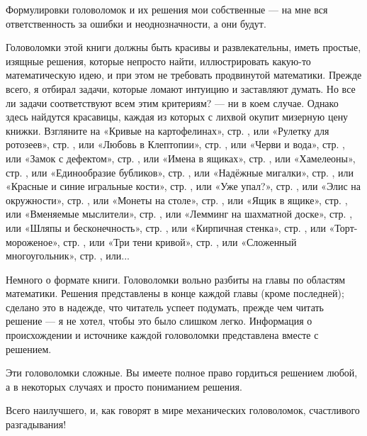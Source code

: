 Формулировки головоломок и их решения мои собственные --- на мне вся ответственность за ошибки и неоднозначности,
а они будут.

Головоломки этой книги должны быть красивы и развлекательны,
иметь простые, изящные решения, которые непросто найти,
иллюстрировать какую-то математическую идею,
и при этом не требовать продвинутой математики.
Прежде всего, я отбирал задачи, которые ломают интуицию и заставляют думать.
Но все ли задачи соответствуют всем этим критериям? --- ни в коем случае.
Однако здесь найдутся красавицы, каждая из которых с лихвой окупит мизерную цену книжки.
Взгляните на
«Кривые на картофелинах», стр. \pageref{Кривые на картофелинах}, или
«Рулетку для ротозеев», стр. \pageref{Рулетка для ротозеев}, или
«Любовь в Клептопии», стр. \pageref{Любовь в Клептопии}, или
«Черви и вода», стр. \pageref{Черви и вода}, или
«Замок с дефектом», стр. \pageref{Замок с дефектом}, или
«Имена в ящиках», стр. \pageref{Имена в ящиках}, или
«Хамелеоны», стр. \pageref{Хамелеоны}, или
«Единообразие бубликов», стр. \pageref{Единообразие бубликов}, или
«Надёжные мигалки», стр. \pageref{Надёжные мигалки}, или
«Красные и синие игральные кости», стр. \pageref{Красные и синие игральные кости}, или
«Уже упал?», стр. \pageref{Уже упал?}, или
«Элис на окружности», стр. \pageref{Элис на окружности}, или
«Монеты на столе», стр. \pageref{Монеты на столе}, или
«Ящик в ящике», стр. \pageref{Ящик в ящике}, или
«Вменяемые мыслители», стр. \pageref{Вменяемые мыслители}, или
«Лемминг на шахматной доске», стр. \pageref{Лемминг на шахматной доске}, или
«Шляпы и бесконечность», стр. \pageref{Шляпы и бесконечность}, или
«Кирпичная стенка», стр. \pageref{Кирпичная стенка}, или
«Торт-мороженое», стр. \pageref{Торт-мороженое}, или
«Три тени кривой», стр. \pageref{Три тени кривой}, или
«Сложенный многоугольник», стр. \pageref{Сложенный многоугольник}, или...

Немного о формате книги.
Головоломки вольно разбиты на главы по областям математики.
Решения представлены в конце каждой главы (кроме последней);
сделано это в надежде, что читатель успеет подумать, прежде чем читать решение --- я не хотел, чтобы это было слишком легко.
Информация о происхождении и источнике каждой головоломки представлена вместе с решением.

Эти головоломки сложные.
Вы имеете полное право гордиться решением любой, а в некоторых случаях и просто пониманием решения.

Всего наилучшего, и, как говорят в мире механических головоломок, счастливого разгадывания!

